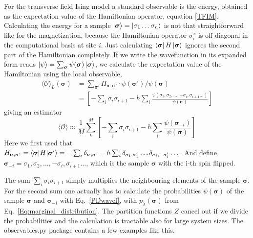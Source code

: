 \documentclass[submission, Phys]{SciPost}
\begin{document}
For the transverse field Ising model a standard observable is the energy, obtained as the expectation value of
the Hamiltonian operator, equation \ref{TFIM}.
Calculating the energy for a sample $\ket{\bm{\sigma} }= \ket{\sigma_1 \dots  \sigma_n}$ is not that straightforward like for the magnetization, because the Hamiltonian operator ${\sigma}^x_i$ is off-diagonal in the computational basis at site $i$. Just calculating $\bra{\bm{\sigma} } H \ket{\bm{\sigma} }$ ignores the second part of the Hamiltonian completely. 
If we write the wavefunction in its expanded form reads $\ket{\psi} = \sum_{\bm{\sigma}} \psi(\bm{\sigma}) \ket{\bm{\sigma}} $, we calculate the expectation value of the Hamiltonian using the local observable,
\begin{align}
\mathcal{\langle O \rangle}_L({\bm{\sigma}}) &= \sum_{ \bm{\sigma'}} H_{\bm{\sigma}, \bm{\sigma}'} \cdot \psi(\bm{\sigma}') / \psi(\bm{\sigma}) \\
&=   \left[ -\sum_i \sigma_i \sigma_{i+1} - h \sum_i \frac{\psi(\sigma_1, \sigma_2, \dots , -\sigma_i, \sigma_{i+1} \dots)}{\psi (\bm{\sigma})} \right]
\end{align}
giving an estimator
\begin{equation}
\mathcal{\langle O \rangle} \approx \frac{1}{M} \sum_k^M \left[ -\sum_i \sigma_i \sigma_{i+1} - h \sum_i \frac{\psi (\bm{\sigma}_{-i})}{\psi (\bm{\sigma})} \right]
\end{equation}
Here we first used that $H_{\bm{\sigma}, \bm{\sigma}'}  = \braket{\bm{\sigma} | H | \bm{\sigma}'} = -\sum_i \delta_{\bm{\sigma}, \bm{\sigma}'} - h \sum_i \delta_{\sigma_1, \sigma_1'} \dots \delta_{\sigma_i, -\sigma_i'} \dots$. And define $\bm{\sigma}_{-i} = \sigma_1, \sigma_2, \dots , -\sigma_i, \sigma_{i+1} \dots$, which is the sample $\bm{\sigma}$ with the i-th spin flipped.

The sum $\sum_i \sigma_i \sigma_{i+1}$ simply multiplies the neighbouring elements of the sample $\bm{\sigma}$. For the second sum one actually has to calculate the probabilities $\psi (\bm{\sigma})$ of the sample $\bm{\sigma}$ and $\bm{\sigma}_{-i} $ with
Eq.~\ref{PDwavef},
with $p_{\lambda}(\bm{\sigma})$ from Eq.~\ref{Eq:marginal_distribution}. The partition functions $Z$ cancel out if we divide the probabilities and the calculation is tractable also for large system sizes.
The observables.py package contains a few examples like this.
\end{document}
